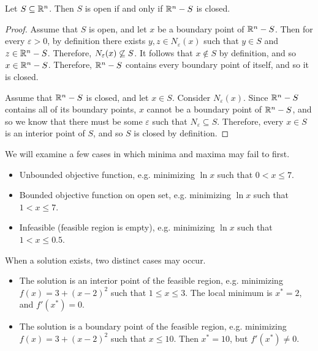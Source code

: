 \begin{prop}
    Let $S \subseteq \mathbb{R}^n$. Then $S$ is open if and only if $\mathbb{R}^n - S$ is closed.
\end{prop}

\begin{proof}
    Assume that $S$ is open, and let $x$ be a boundary point of $\mathbb{R}^n - S$. Then for every $\varepsilon > 0$, by definition there exists $y, z \in N_{\varepsilon}(x)$ such that $y \in S$ and $z \in \mathbb{R}^n - S$. Therefore, $N_{\varepsilon}(x) \centernot\subseteq S$. It follows that $x \notin S$ by definition, and so $x \in \mathbb{R}^n - S$. Therefore, $\mathbb{R}^n - S$ contains every boundary point of itself, and so it is closed.

    Assume that $\mathbb{R}^n - S$ is closed, and let $x \in S$. Consider $N_{\varepsilon}(x)$. Since $\mathbb{R}^n - S$ contains all of its boundary points, $x$ cannot be a boundary point of $\mathbb{R}^n - S$, and so we know that there must be some $\varepsilon$ such that $N_{\varepsilon} \subseteq S$. Therefore, every $x \in S$ is an interior point of $S$, and so $S$ is closed by definition.
\end{proof}

\begin{exmp}
    We will examine a few cases in which minima and maxima may fail to first.

    \begin{itemize}
        \item Unbounded objective function, e.g. minimizing $\ln x$ such that $0 < x \leq 7$.
        \item Bounded objective function on open set, e.g. minimizing $\ln x$ such that $1 < x \leq 7$.
        \item Infeasible (feasible region is empty), e.g. minimizing $\ln x$ such that $1 < x \leq 0.5$.
    \end{itemize}
\end{exmp}

\begin{exmp}
    When a solution exists, two distinct cases may occur.

    \begin{itemize}
        \item The solution is an interior point of the feasible region, e.g. minimizing $f(x) = 3 + (x - 2)^2$ such that $1 \leq x \leq 3$. The local minimum is $x^* = 2$, and $f'(x^*) = 0$.
        \item The solution is a boundary point of the feasible region, e.g. minimizing $f(x) = 3 + (x - 2)^2$ such that $x \leq 10$. Then $x^* = 10$, but $f'(x^*) \neq 0$.
    \end{itemize}
\end{exmp}


